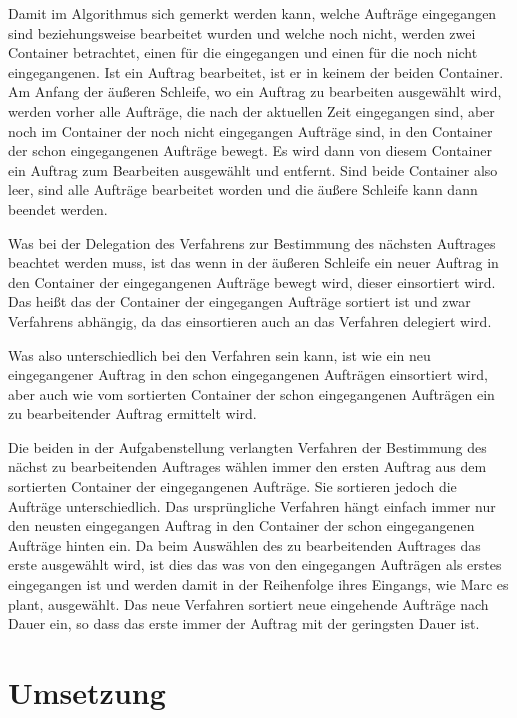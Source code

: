 \documentclass[a4paper,10pt,ngerman]{scrartcl}
\begin{document}
Damit im Algorithmus sich gemerkt werden kann,
welche Aufträge eingegangen sind beziehungsweise bearbeitet wurden
und welche noch nicht, werden zwei Container betrachtet,
einen für die eingegangen und einen für die noch nicht eingegangenen.
Ist ein Auftrag bearbeitet, ist er in keinem der beiden Container.
Am Anfang der äußeren Schleife, wo ein Auftrag zu bearbeiten ausgewählt wird,
werden vorher alle Aufträge,
die nach der aktuellen Zeit eingegangen sind,
aber noch im Container der noch nicht eingegangen Aufträge sind,
in den Container der schon eingegangenen Aufträge bewegt.
Es wird dann von diesem Container ein Auftrag zum Bearbeiten ausgewählt und entfernt.
Sind beide Container also leer, sind alle Aufträge bearbeitet worden
und die äußere Schleife kann dann beendet werden.

Was bei der Delegation des Verfahrens zur Bestimmung des nächsten Auftrages beachtet werden muss,
ist das wenn in der äußeren Schleife ein neuer Auftrag in den Container der eingegangenen Aufträge bewegt wird,
dieser einsortiert wird.
Das heißt das der Container der eingegangen Aufträge sortiert ist
und zwar Verfahrens abhängig,
da das einsortieren auch an das Verfahren delegiert wird.

Was also unterschiedlich bei den Verfahren sein kann, ist wie ein neu eingegangener Auftrag
in den schon eingegangenen Aufträgen einsortiert wird,
aber auch wie vom sortierten Container der schon eingegangenen Aufträgen
ein zu bearbeitender Auftrag ermittelt wird.

Die beiden in der Aufgabenstellung verlangten Verfahren der Bestimmung
des nächst zu bearbeitenden Auftrages wählen immer den ersten Auftrag
aus dem sortierten Container der eingegangenen Aufträge.
Sie sortieren jedoch die Aufträge unterschiedlich.
Das ursprüngliche Verfahren hängt einfach immer nur den neusten eingegangen Auftrag
in den Container der schon eingegangenen Aufträge hinten ein.
Da beim Auswählen des zu bearbeitenden Auftrages das erste ausgewählt wird,
ist dies das was von den eingegangen Aufträgen als erstes eingegangen ist
und werden damit in der Reihenfolge ihres Eingangs, wie Marc es plant, ausgewählt.
Das neue Verfahren sortiert neue eingehende Aufträge nach Dauer ein,
so dass das erste immer der Auftrag mit der geringsten Dauer ist.


\section{Umsetzung}\label{sec:umsetzung}
\end{document}
